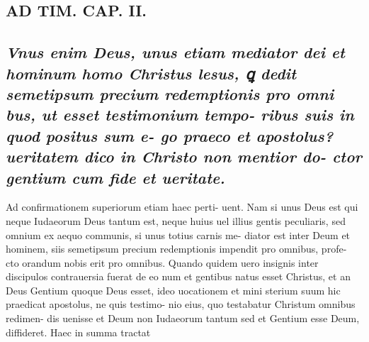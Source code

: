 \documentclass{article}
\begin{document}
\begin{pages}
\section*{AD TIM. CAP. II. }
\marginpar{[ p.117 ]}
{}
\subsection*{\textit{Vnus enim Deus, unus etiam mediator dei et hominum homo Christus lesus, ꝗ dedit semetipsum precium redemptionis pro omni bus, ut esset testimonium tempo- ribus suis in quod positus sum e- go praeco et apostolus? ueritatem dico in Christo non mentior do- ctor gentium cum fide et ueritate. }}\pstart Ad confirmationem superiorum etiam haec perti- uent. Nam si unus Deus est qui neque Iudaeorum Deus tantum est, neque huius uel illius gentis peculiaris, sed omnium ex aequo communis, si unus totius carnis me- diator est inter Deum et hominem, siis semetipsum precium redemptionis impendit pro omnibus, profe- cto orandum nobis erit pro omnibus. Quando quidem uero insignis inter discipulos contrauersia fuerat de eo num et gentibus natus esset Christus, et an Deus Gentium quoque Deus esset, ideo uocationem et mini sterium suum hic praedicat apostolus, ne quis testimo- nio eius, quo testabatur Christum omnibus redimen- dis uenisse et Deum non Iudaeorum tantum sed et Gentium esse Deum, diffideret. Haec in summa tractat  \pend

\end{pages}
\end{document}
